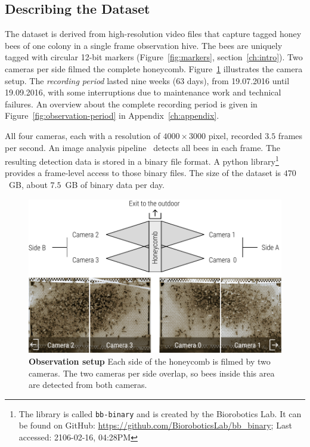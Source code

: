 \subsection{Describing the Dataset}
\label{sec:dataset}
The dataset is derived from high-resolution video files that capture tagged honey bees of one colony in a single frame observation hive.
The bees are uniquely tagged with circular 12-bit markers (Figure~\ref{fig:markers}, section~\ref{ch:intro}).
Two cameras per side filmed the complete honeycomb.
Figure~\ref{fig:obssetup} illustrates the camera setup.
The \emph{recording period} lasted nine weeks (63 days), from 19.07.2016 until 19.09.2016, with some interruptions due to maintenance work and technical failures.
An overview about the complete recording period is given in Figure~\ref{fig:observation-period} in Appendix~\ref{ch:appendix}.

All four cameras, each with a resolution of $4000\times3000$ pixel, recorded $3.5$ frames per second. 
An image analysis pipeline~\cite{wario2015automatic} detects all bees in each frame.
The resulting detection data is stored in a binary file format.
A python library\footnote{The library is called \texttt{bb-binary} and is created by the Biorobotics Lab. It can be found on GitHub: \url{https://github.com/BioroboticsLab/bb_binary}; Last accessed: 2106-02-16, 04:28PM} provides a frame-level access to those binary files.
The size of the dataset is $470$~GB, about $7.5$~GB of binary data per day.

\begin{figure}
	\centering
	\includegraphics[width=1.0\textwidth]{Figures/setupCams}
 	\caption[Observation setup]{\textbf{Observation setup} Each side of the honeycomb is filmed by two cameras. The two cameras per side overlap, so bees inside this area are detected from both cameras.}
 	\label{fig:obssetup}
\end{figure}

